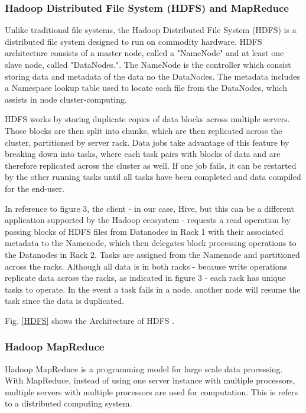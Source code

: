 \documentclass[journal]{IEEEtran}
\begin{document}
\subsubsection{Hadoop Distributed File System (HDFS) and  MapReduce}

Unlike traditional file systems, the Hadoop Distributed File System (HDFS) is a distributed file system designed to run on commodity hardware. 
HDFS architecture consists of a master node, called a "NameNode" and at least one slave node, called "DataNodes."\cite{HDFSarchitecture}.
The NameNode is the controller which consist storing data and metadata of the data no the DataNodes. 
The metadata includes a Namespace lookup table used to locate each file from the DataNodes, which assists in node cluster-computing. 

HDFS works by storing duplicate copies of data blocks across multiple servers. Those blocks are then split into chunks, which are then 
replicated across the cluster, partitioned by server rack. Data jobs take advantage of this feature by breaking down into tasks, 
where each task pairs with blocks of data and are therefore replicated across the cluster as well. If one job fails, it can be restarted 
by the other running tasks until all tasks have been completed and data compiled for the end-user. \cite{HadoopAdmin}

In reference to figure 3, the client - in our case, Hive, but this can be a different application supported by the Hadoop ecosystem - requests a 
read operation by passing blocks of HDFS files from Datanodes in Rack 1 with their associated metadata to the Namenode, which then delegates
block processing operations to the Datanodes in Rack 2. Tasks are assigned from the Namenode and partitioned across the racks. 
Although all data is in both racks - because write operations replicate data across the racks, as indicated in figure 3 - each rack has unique tasks
to operate. In the event a task fails in a node, another node will resume the task since the data is duplicated. \cite{HadoopAdmin}

Fig. \ref{HDFS} shows the Architecture of HDFS \cite{HDFS}.

\subsubsection{Hadoop MapReduce}

Hadoop MapReduce is a programming model for large scale data processing. With MapReduce, instead of using one server instance with multiple 
processors, multiple servers with multiple processors are used for computation. This is refers to a distributed computing system.
\end{document}
